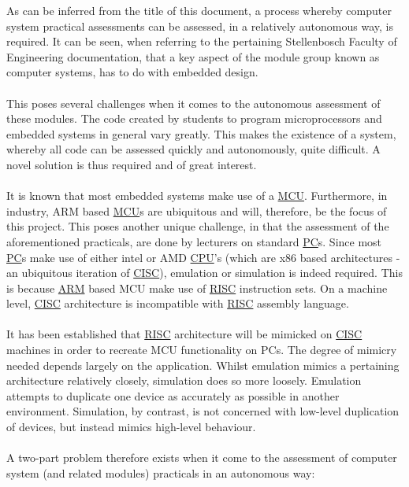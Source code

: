 As can be inferred from the title of this document, a process whereby computer system practical assessments can be assessed, in a relatively autonomous way, is required. It can be seen, when referring to the pertaining Stellenbosch Faculty of Engineering documentation, that a key aspect of the module group known as computer systems, has to do with embedded design. \cite{Stelle2020}
\\\\
This poses several challenges when it comes to the autonomous assessment of these modules. The code created by students to program microprocessors and embedded systems in general vary greatly. This makes the existence of a system, whereby all code can be assessed quickly and autonomously, quite difficult. A novel solution is thus required and of great interest.
\\\\
It is known that most embedded systems make use of a \hyperref[listAbr]{MCU}. Furthermore, in industry, ARM based \hyperref[listAbr]{MCU}s are ubiquitous and will, therefore, be the focus of this project. This poses another unique challenge, in that the assessment of the aforementioned practicals, are done by lecturers on standard \hyperref[listAbr]{PC}s. Since most \hyperref[listAbr]{PC}s make use of either intel\textsuperscript{{\tiny{\textregistered}}} or AMD\textsuperscript{{\tiny{\textregistered}}} \hyperref[listAbr]{CPU}'s (which are x86 based architectures - an ubiquitous iteration of \hyperref[listAbr]{CISC}), emulation or simulation is indeed required. This is because \hyperref[listAbr]{ARM} based MCU make use of \hyperref[listAbr]{RISC} instruction sets. On a machine level, \hyperref[listAbr]{CISC} architecture is incompatible with \hyperref[listAbr]{RISC} assembly language.
\\\\
It has been established that \hyperref[listAbr]{RISC} architecture will be mimicked on \hyperref[listAbr]{CISC} machines in order to recreate MCU functionality on PCs. The degree of mimicry needed depends largely on the application. Whilst emulation mimics a pertaining architecture relatively closely, simulation does so more loosely. Emulation attempts to duplicate one device as accurately as possible in another environment. Simulation, by contrast, is not concerned with low-level duplication of devices, but instead mimics high-level behaviour.\cite{Chris}
\\\\
A two-part problem therefore exists when it come to the assessment of computer system (and related modules) practicals in an autonomous way:

